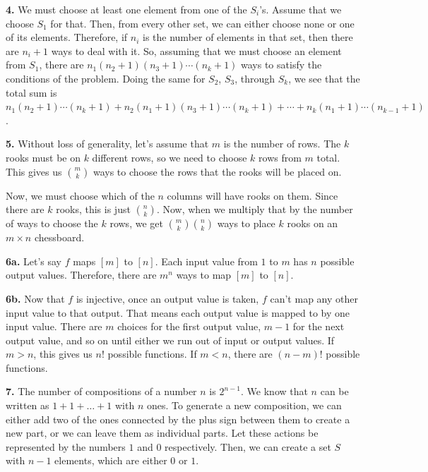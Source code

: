 \documentclass{article}
\begin{document}
\textbf{4.} We must choose at least one element from one of the $S_i$'s. Assume that we choose $S_1$ for that. Then, from every other set, we can either choose none or one of its elements. Therefore, if $n_i$ is the number of elements in that set, then there are $n_i + 1$ ways to deal with it. So, assuming that we must choose an element from $S_1$, there are $n_1(n_2 + 1)(n_3 + 1)\cdots (n_k + 1)$ ways to satisfy the conditions of the problem. Doing the same for $S_2$, $S_3$, through $S_k$, we see that the total sum is $n_1(n_2 + 1)\cdots(n_k + 1) + n_2(n_1 + 1)(n_3 + 1)\cdots(n_k + 1) + \cdots + n_k(n_1 + 1)\cdots(n_{k - 1} + 1)$.
\newline

\textbf{5.} Without loss of generality, let's assume that $m$ is the number of rows. The $k$ rooks must be on $k$ different rows, so we need to choose $k$ rows from $m$ total. This gives us $m\choose k$ ways to choose the rows that the rooks will be placed on. 
\newline

Now, we must choose which of the $n$ columns will have rooks on them. Since there are $k$ rooks, this is just $n\choose k$. Now, when we multiply that by the number of ways to choose the $k$ rows, we get $m\choose k$$n\choose k$ ways to place $k$ rooks on an $m\times n$ chessboard.
\newline

\textbf{6a.} Let's say $f$ maps $[m]$ to $[n]$. Each input value from $1$ to $m$ has $n$ possible output values. Therefore, there are $m^n$ ways to map $[m]$ to $[n]$.
\newline

\textbf{6b.} Now that $f$ is injective, once an output value is taken, $f$ can't map any other input value to that output. That means each output value is mapped to by one input value. There are $m$ choices for the first output value, $m - 1$ for the next output value, and so on until either we run out of input or output values. If $m > n$, this gives us $n!$ possible functions. If $m < n$, there are $(n - m)!$ possible functions.
\newline

\textbf{7.} The number of compositions of a number $n$ is $2^{n - 1}$. We know that $n$ can be written as $1 + 1 + \ldots + 1$ with $n$ ones. To generate a new composition, we can either add two of the ones connected by the plus sign between them to create a new part, or we can leave them as individual parts. Let these actions be represented by the numbers $1$ and $0$ respectively. Then, we can create a set $S$ with $n - 1$ elements, which are either $0$ or $1$.
\newline
\end{document}
